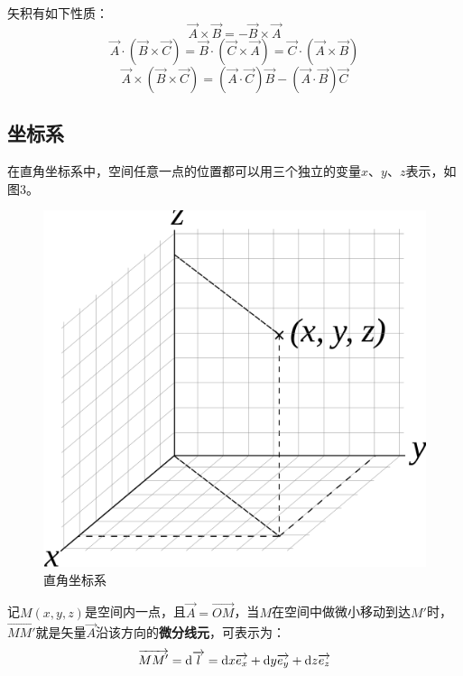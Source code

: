 \documentclass[UTF8,a4paper,11pt]{article}
\begin{document}
矢积有如下性质：
\begin{equation}
\overrightarrow{A}\times\overrightarrow{B}=-\overrightarrow{B}\times\overrightarrow{A}
\end{equation}
\begin{equation}
\overrightarrow{A}\cdot(\overrightarrow{B}\times\overrightarrow{C})=\overrightarrow{B}\cdot(\overrightarrow{C}\times\overrightarrow{A})=\overrightarrow{C}\cdot(\overrightarrow{A}\times\overrightarrow{B})
\end{equation}
\begin{equation}
\overrightarrow{A}\times(\overrightarrow{B}\times\overrightarrow{C})=(\overrightarrow{A}\cdot\overrightarrow{C})\overrightarrow{B}-(\overrightarrow{A}\cdot\overrightarrow{B})\overrightarrow{C}
\end{equation}

\subsection{坐标系}
在直角坐标系中，空间任意一点的位置都可以用三个独立的变量$x$、$y$、$z$表示，如图3。
\begin{figure}[htbp]
\centering
\includegraphics[scale=0.2]{p3.png}
\caption{直角坐标系}
\end{figure}

记$M(x,y,z)$是空间内一点，且$\overrightarrow{A}=\overrightarrow{OM}$，当$M$在空间中做微小移动到达$M'$时，$\overrightarrow{MM'}$就是矢量$\overrightarrow{A}$沿该方向的\textbf{微分线元}，可表示为：
\begin{equation}
\overrightarrow{MM'}={\rm d}\overrightarrow{l}={\rm d}x\overrightarrow{e_x}+{\rm d}y\overrightarrow{e_y}+{\rm d}z\overrightarrow{e_z}
\end{equation}
\end{document}
